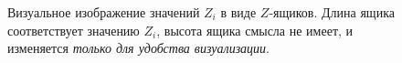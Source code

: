 \documentclass[letterpaper, 11pt]{article}
\begin{document}
\begin{figure}[H]
  \caption{Визуальное изображение значений $Z_i$ в виде $Z$-ящиков. Длина ящика соответствует значению $Z_i$, высота ящика смысла не имеет, и изменяется \textit{только для удобства визуализации}.}
\end{figure}
\end{document}

